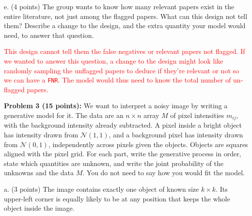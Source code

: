 \documentclass[11pt]{article}
\begin{document}
e. (4 points) The group wants to know how many relevant papers exist in the entire literature, not just among the flagged papers.  What can this design not tell them?  Describe a change to the design, and the extra quantity your model would need, to answer that question.

\textcolor{red}{
This design cannot tell them the false negatives or relevant papers not flagged. If we wanted to answer this question, a change to the design might look like randomly sampling the unflagged papers to deduce if they're relevant or not so we can have a \texttt{FNR}. The model would thus need to know the total number of un-flagged papers.
}

{\bf Problem 3 (15 points):} We want to interpret a noisy image by writing a generative model for it.  The data are an $n\times n$ array $M$ of pixel intensities $m_{ij}$, with the background intensity already subtracted.  A pixel inside a bright object has intensity drawn from $\mathcal N(1,1)$, and a background pixel has intensity drawn from $\mathcal N(0,1)$, independently across pixels given the objects.  Objects are squares aligned with the pixel grid.  For each part, write the generative process in order, state which quantities are unknown, and write the joint probability of the unknowns and the data $M$.  You do not need to say how you would fit the model.

a. (3 points) The image contains exactly one object of known size $k\times k$.  Its upper-left corner is equally likely to be at any position that keeps the whole object inside the image.
\end{document}
